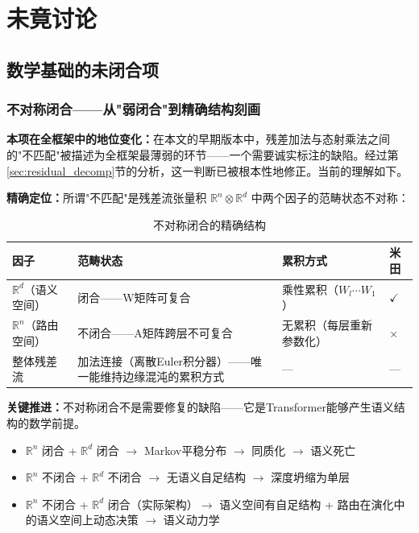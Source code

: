 \documentclass[11pt,a4paper]{article}
\theoremstyle{definition}
\begin{document}
\section{未竟讨论}
\label{sec:open}

\subsection{数学基础的未闭合项}

\subsubsection{不对称闭合——从"弱闭合"到精确结构刻画}
\label{sec:open_asymmetric}

\textbf{本项在全框架中的地位变化：}在本文的早期版本中，残差加法与态射乘法之间的"不匹配"被描述为全框架最薄弱的环节——一个需要诚实标注的缺陷。经过第\ref{sec:residual_decomp}节的分析，这一判断已被根本性地修正。当前的理解如下。

\textbf{精确定位：}所谓"不匹配"是残差流张量积 $\mathbb{R}^n \otimes \mathbb{R}^d$ 中两个因子的范畴状态不对称：

\begin{table}[H]
\centering
\caption{不对称闭合的精确结构}
\begin{tabular}{@{}p{2.5cm}p{3cm}p{3.5cm}p{2cm}@{}}
\toprule
\textbf{因子} & \textbf{范畴状态} & \textbf{累积方式} & \textbf{米田} \\
\midrule
$\mathbb{R}^d$（语义空间） & 闭合——W矩阵可复合 & 乘性累积（$W_l \cdots W_1$） & $\checkmark$ \\
$\mathbb{R}^n$（路由空间） & 不闭合——A矩阵跨层不可复合 & 无累积（每层重新参数化） & $\times$ \\
整体残差流 & 加法连接（离散Euler积分器）——唯一能维持边缘混沌的累积方式 & — & — \\
\bottomrule
\end{tabular}
\end{table}

\textbf{关键推进：}不对称闭合不是需要修复的缺陷——它是Transformer能够产生语义结构的数学前提。
\begin{itemize}[leftmargin=*,itemsep=0.2em]
    \item $\mathbb{R}^n$ 闭合 + $\mathbb{R}^d$ 闭合 $\to$ Markov平稳分布 $\to$ 同质化 $\to$ 语义死亡
    \item $\mathbb{R}^n$ 不闭合 + $\mathbb{R}^d$ 不闭合 $\to$ 无语义自足结构 $\to$ 深度坍缩为单层
    \item $\mathbb{R}^n$ 不闭合 + $\mathbb{R}^d$ 闭合（实际架构）$\to$ 语义空间有自足结构 + 路由在演化中的语义空间上动态决策 $\to$ 语义动力学
\end{itemize}
\end{document}
